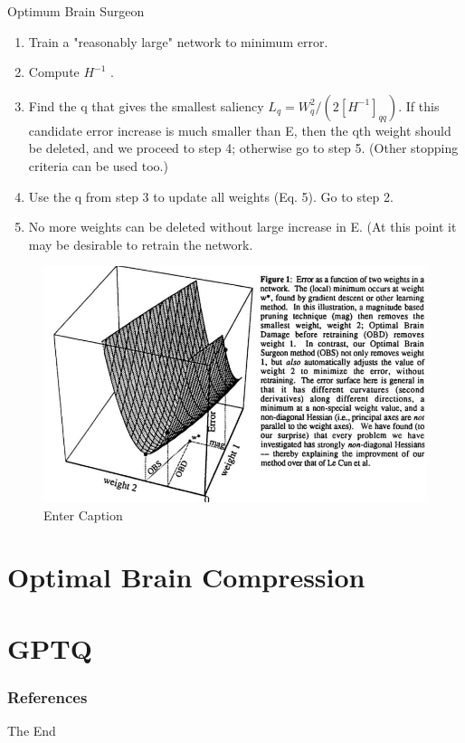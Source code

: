 \documentclass{beamer}
\theoremstyle{plain}
\theoremstyle{definition}
\theoremstyle{remark}
\numberwithin{equation}{section}
\numberwithin{figure}{section}
\numberwithin{theorem}{section}
\begin{document}
\begin{frame}{Optimum Brain Surgeon}
\begin{enumerate}
    \item Train a "reasonably large" network to minimum error.
    \item Compute $H^{-1}$ .
    \item Find the q that gives the smallest saliency $L_q = W_q^2/(2[H^{-1}]_{qq})$. If this candidate error
            increase is much smaller than E, then the qth weight should be deleted, and we
            proceed to step 4; otherwise go to step 5. (Other stopping criteria can be used too.)
    \item Use the q from step 3 to update all weights (Eq. 5). Go to step 2.
    \item No more weights can be deleted without large increase in E. (At this point it may be
desirable to retrain the network.
\end{enumerate}
\end{frame}
\begin{frame}
\begin{figure}
    \centering
    \includegraphics[width=0.9\linewidth]{obs.png}
    \caption{Enter Caption}
    \label{fig:enter-label}
\end{figure}
\end{frame}
\section{Optimal Brain Compression}
\section{GPTQ}



\begin{frame}[t, allowframebreaks]
\frametitle{References}
%
%
\end{frame}


\begin{frame}
\Huge{\centerline{The End}}
\end{frame}

\end{document}
